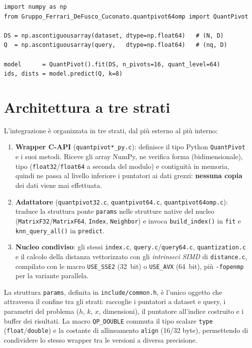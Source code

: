 \begin{verbatim}
import numpy as np
from Gruppo_Ferrari_DeFusco_Cuconato.quantpivot64omp import QuantPivot

DS = np.ascontiguousarray(dataset, dtype=np.float64)   # (N, D)
Q  = np.ascontiguousarray(query,   dtype=np.float64)   # (nq, D)

model      = QuantPivot().fit(DS, n_pivots=16, quant_level=64)
ids, dists = model.predict(Q, k=8)
\end{verbatim}

\section{Architettura a tre strati}
L'integrazione è organizzata in tre strati, dal più esterno al più interno:

\begin{enumerate}
    \item \textbf{Wrapper C-API} (\texttt{quantpivot*\_py.c}): definisce il tipo Python \texttt{QuantPivot} e i suoi metodi. Riceve gli array NumPy, ne verifica forma (bidimensionale), tipo (\texttt{float32}/\texttt{float64} a seconda del modulo) e contiguità in memoria, quindi ne passa al livello inferiore i puntatori ai dati grezzi: \textbf{nessuna copia} dei dati viene mai effettuata.
    \item \textbf{Adattatore} (\texttt{quantpivot32.c}, \texttt{quantpivot64.c}, \texttt{quantpivot64omp.c}): traduce la struttura ponte \texttt{params} nelle strutture native del nucleo (\texttt{MatrixF32}/\texttt{MatrixF64}, \texttt{Index}, \texttt{Neighbor}) e invoca \texttt{build\_index()} in \texttt{fit} e \texttt{knn\_query\_all()} in \texttt{predict}.
    \item \textbf{Nucleo condiviso}: gli stessi \texttt{index.c}, \texttt{query.c}/\texttt{query64.c}, \texttt{quantization.c} e il calcolo della distanza vettorizzato con gli \emph{intrinseci SIMD} di \texttt{distance.c}, compilato con le macro \texttt{USE\_SSE2} (32~bit) o \texttt{USE\_AVX} (64~bit), più \texttt{-fopenmp} per la variante parallela.
\end{enumerate}

La struttura \texttt{params}, definita in \texttt{include/common.h}, è l'unico oggetto che attraversa il confine tra gli strati: raccoglie i puntatori a dataset e query, i parametri del problema ($h$, $k$, $x$, dimensioni), il puntatore all'indice costruito e i buffer dei risultati. La macro \texttt{QP\_DOUBLE} commuta il tipo scalare \texttt{type} (\texttt{float}/\texttt{double}) e la costante di allineamento \texttt{align} (16/32 byte), permettendo di condividere lo stesso wrapper tra le versioni a diversa precisione.

